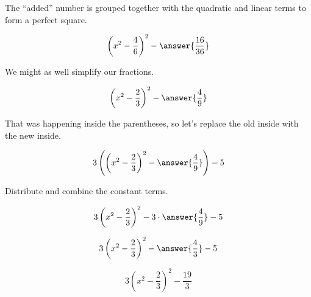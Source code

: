 \documentclass{ximera}
\begin{document}
\begin{exercise}
\begin{procedure}
The ``added'' number is grouped together with the quadratic and linear terms to form a perfect square.



\[ \left( x^2 - \frac{4}{6} \right)^2  - \answer{\frac{16}{36}} \]



We might as well simplify our fractions.

\[ \left( x^2 - \frac{2}{3} \right)^2  - \answer{\frac{4}{9}} \]

\end{procedure}


That was happening inside the parentheses, so let's replace the old inside with the new inside.


\[ 3 \left(  \left( x^2 - \frac{2}{3} \right)^2  - \answer{\frac{4}{9}}   \right) - 5  \]




Distribute and combine the constant terms.



\[ 3 \left( x^2 - \frac{2}{3} \right)^2  - 3 \cdot \answer{\frac{4}{9}} - 5   \]



\[ 3 \left( x^2 - \frac{2}{3} \right)^2  - \answer{\frac{4}{3}} - 5   \]




\[ 3 \left( x^2 - \frac{2}{3} \right)^2  - \frac{19}{3}    \]






\end{exercise}
\end{document}
